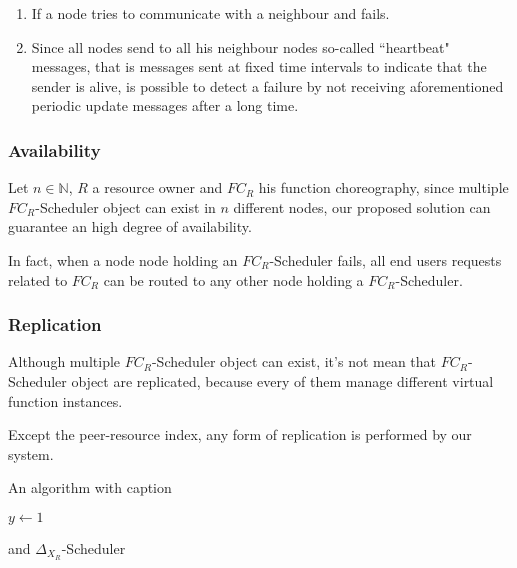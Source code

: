 \documentclass[10pt,a4paper]{article}
\theoremstyle{definition}
\begin{document}
\begin{enumerate}
\item If a node tries to communicate with a neighbour and fails.
\item Since all nodes send to all his neighbour nodes so-called ``heartbeat" messages, that is messages sent at fixed time intervals to indicate that the sender is alive, is possible to detect a failure by not receiving aforementioned periodic update messages after a long time. 

\end{enumerate}

\subsubsection{Availability}

Let $n \in \mathbb{N}$, $R$ a resource owner and $FC_R$ his function choreography, since multiple $FC_R$-Scheduler object can exist in $n$ different nodes, our proposed solution can guarantee an high degree of availability. 

In fact, when a node node holding an $FC_R$-Scheduler fails, all end users requests related to $FC_R$ can be routed to any other node holding a $FC_R$-Scheduler. 

\subsubsection{Replication}

Although multiple $FC_R$-Scheduler object can exist, it's not mean that $FC_R$-Scheduler object are replicated, because every of them manage different virtual function instances. 

Except the peer-resource index, any form of replication is performed by our system.







\begin{algorithm}
\caption{An algorithm with caption}\label{alg:cap}
\begin{algorithmic}

\State $y \gets 1$


\end{algorithmic}
\end{algorithm}




 and $\Delta_{X_{R}}$-Scheduler
\end{document}
